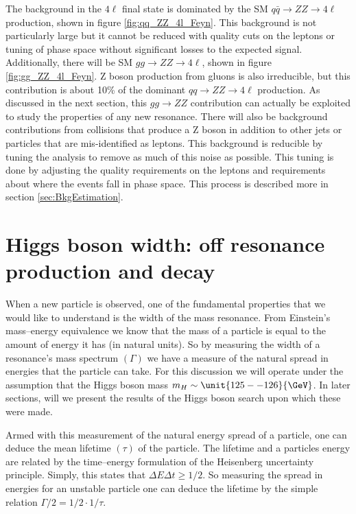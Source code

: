 The background in the $4\ell$ final state is dominated by the SM $q\bar{q} \to ZZ \to 4\ell$ production, shown in figure \ref{fig:qq_ZZ_4l_Feyn}. This background is not particularly large but it cannot be reduced with quality cuts on the leptons or tuning of phase space without significant losses to the expected signal. Additionally, there will be SM $gg \to ZZ \to 4\ell$, shown in figure \ref{fig:gg_ZZ_4l_Feyn}. Z boson production from gluons is also irreducible, but this contribution is about 10\% of the dominant $qq \to ZZ \to 4\ell$ production. As discussed in the next section, this $gg \to ZZ$ contribution can actually be exploited to study the properties of any new resonance. There will also be background contributions from collisions that produce a Z boson in addition to other jets or particles that are mis-identified as leptons. This background is reducible by tuning the analysis to remove as much of this noise as possible. This tuning is done by adjusting the quality requirements on the leptons and requirements about where the events fall in phase space. This process is described more in section \ref{sec:BkgEstimation}.

\section{Higgs boson width: off resonance production and decay}
\label{sec:Higgs_Width_Pheno}

When a new particle is observed, one of the fundamental properties that we would like to understand is the width of the mass resonance. From Einstein's mass--energy equivalence we know that the mass of a particle is equal to the amount of energy it has (in natural units). So by measuring the width of a resonance's mass spectrum $\left(\Gamma\right)$ we have a measure of the natural spread in energies that the particle can take. For this discussion we will operate under the assumption that the Higgs boson mass $m_{H} \sim \unit{125 -- 126}{\GeV}$. In later sections, will we present the results of the Higgs boson search upon which these were made.

Armed with this measurement of the natural energy spread of a particle, one can deduce the mean lifetime $\left(\tau\right)$ of the particle. The lifetime and a particles energy are related by the time--energy formulation of the Heisenberg uncertainty principle. Simply, this states that $\Delta E \Delta t \geq 1/2$. So measuring the spread in energies for an unstable particle one can deduce the lifetime by the simple relation $\Gamma/2 = 1/2\cdot 1/\tau$. 

